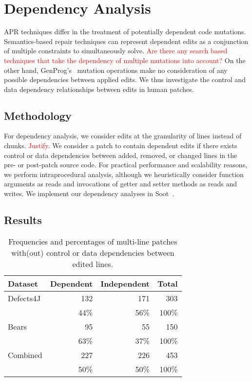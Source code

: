 \documentclass[sigconf, timestamp-false, anonymous=true]{acmart}
\newcommand\todo[1]{\textcolor{red}{#1}}
\begin{document}




\section{Dependency Analysis}


APR techniques differ in the treatment of potentially dependent code mutations.
Semantics-based repair techniques can represent dependent edits as a 
conjunction of multiple constraints to simultaneously solve.
\todo{Are there any search based techniques that take the dependency of 
multiple mutations into account?}
On the other hand, GenProg's~\cite{genprog}
mutation operations make no consideration of 
any possible dependencies between applied edits.
We thus investigate the control and data dependency relationships between 
edits in human patches.

\subsection{Methodology}

For dependency analysis, we consider edits at the granularity of lines instead 
of chunks. \todo{Justify.} We consider a patch to contain
dependent edits if there exists control or data dependencies 
between added, removed, or changed lines in the pre- or post-patch
source code. For practical performance and scalability
reasons, we perform intraprocedural analysis, 
although we heuristically consider function arguments as reads 
and invocations of getter and setter methods as reads and writes.
We implement our dependency analyses in Soot~\cite{soot}.

\subsection{Results}

\begin{table}
{\begin{center}
	\begin{tabular}{l | r r | r}
		\toprule
		Dataset & Dependent & Independent & Total \\
		\midrule
		Defects4J & 132 & 171 & 303 \\
		& 44\% & 56\% & 100\% \\
		Bears & 95 & 55 & 150 \\
		& 63\% & 37\% & 100\% \\
		Combined & 227 & 226 & 453 \\
		&  50\% & 50\% & 100\% \\
		\bottomrule
	\end{tabular}
 \end{center}
}
	\caption{Frequencies and percentages of multi-line patches with(out) control or data 
	dependencies between edited lines.}
	\label{tab:dependency}
\end{table}
\end{document}
